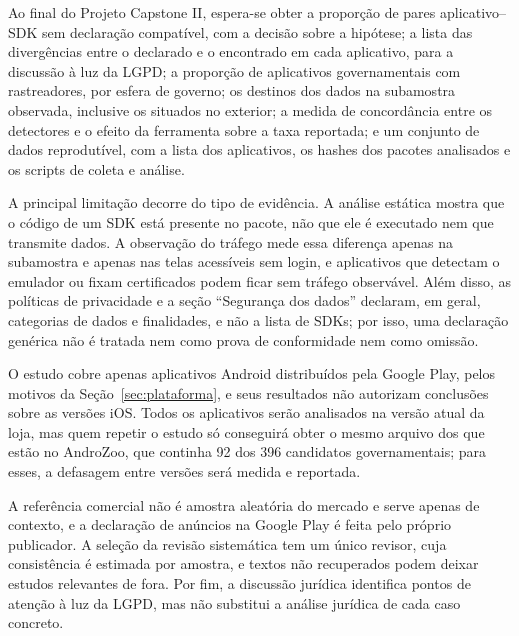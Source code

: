 \label{sec:1.6}

Ao final do Projeto Capstone II, espera-se obter a proporção de pares aplicativo--SDK sem declaração compatível, com a decisão sobre a hipótese; a lista das divergências entre o declarado e o encontrado em cada aplicativo, para a discussão à luz da LGPD; a proporção de aplicativos governamentais com rastreadores, por esfera de governo; os destinos dos dados na subamostra observada, inclusive os situados no exterior; a medida de concordância entre os detectores e o efeito da ferramenta sobre a taxa reportada; e um conjunto de dados reprodutível, com a lista dos aplicativos, os hashes dos pacotes analisados e os scripts de coleta e análise.

\label{sec:1.7}

A principal limitação decorre do tipo de evidência. A análise estática mostra que o código de um SDK está presente no pacote, não que ele é executado nem que transmite dados. A observação do tráfego mede essa diferença apenas na subamostra e apenas nas telas acessíveis sem login, e aplicativos que detectam o emulador ou fixam certificados podem ficar sem tráfego observável. Além disso, as políticas de privacidade e a seção ``Segurança dos dados'' declaram, em geral, categorias de dados e finalidades, e não a lista de SDKs; por isso, uma declaração genérica não é tratada nem como prova de conformidade nem como omissão.

O estudo cobre apenas aplicativos Android distribuídos pela Google Play, pelos motivos da Seção~\ref{sec:plataforma}, e seus resultados não autorizam conclusões sobre as versões iOS. Todos os aplicativos serão analisados na versão atual da loja, mas quem repetir o estudo só conseguirá obter o mesmo arquivo dos que estão no AndroZoo, que continha 92 dos 396 candidatos governamentais; para esses, a defasagem entre versões será medida e reportada.

A referência comercial não é amostra aleatória do mercado e serve apenas de contexto, e a declaração de anúncios na Google Play é feita pelo próprio publicador. A seleção da revisão sistemática tem um único revisor, cuja consistência é estimada por amostra, e textos não recuperados podem deixar estudos relevantes de fora. Por fim, a discussão jurídica identifica pontos de atenção à luz da LGPD, mas não substitui a análise jurídica de cada caso concreto.
